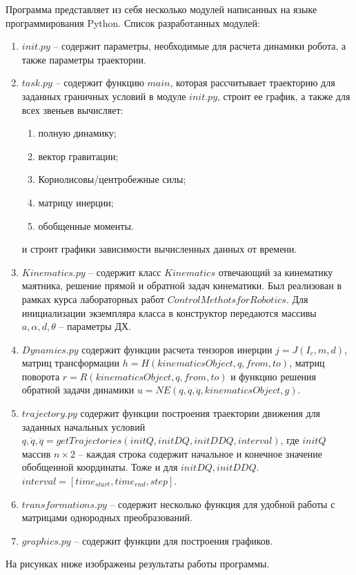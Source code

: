 \documentclass[a4paper,14pt]{extreport}
\begin{document}
Программа представляет из себя несколько модулей написанных на языке программирования Python. Список разработанных модулей:
\begin{enumerate}
\item $init.py$ -- содержит параметры, необходимые для расчета динамики робота, а также параметры траектории.
\item $task.py$ -- содержит функцию $main$, которая рассчитывает траекторию для заданных граничных условий в модуле $init.py$, строит ее график, а также для всех звеньев вычисляет:
\begin{enumerate}
	\item полную динамику;
	\item вектор гравитации;
	\item Кориолисовы/центробежные силы;
	\item матрицу инерции;
	\item обобщенные моменты.
\end{enumerate}
и строит графики зависимости вычисленных данных от времени.
\item $Kinematics.py$ -- содержит класс $Kinematics$ отвечающий за кинематику маятника, решение прямой и обратной задач кинематики. Был реализован в рамках курса лабораторных работ $Control Methots for Robotics$.
Для инициализации экземпляра класса в конструктор передаются массивы $a, \alpha, d, \theta$ -- параметры ДХ.
\item $Dynamics.py$ содержит функции расчета тензоров инерции $j = J(I_c, m, d)$, матриц трансформации $h = H(kinematicsObject, q, from, to)$, матриц поворота $r = R(kinematicsObject, q, from, to)$ и функцию решения обратной задачи динамики $u = NE(q,\dot q, \ddot q, kinematicsObject, g)$.
\item $trajectory.py$ содержит функции построения траектории движения для заданных начальных условий $q, \dot q, \ddot q = getTrajectories(initQ, initDQ, initDDQ, interval)$, где $initQ$ массив $n \times 2$ -- каждая строка содержит начальное и конечное значение обобщенной координаты. Тоже и для $initDQ, initDDQ$. $interval = [time_{start}, time_{end}, step]$.
\item $transformations.py$ -- содержит несколько функция для удобной работы с матрицами однородных преобразований.
\item $graphics.py$ -- содержит функции для построения графиков.
\end{enumerate}

На рисунках ниже изображены результаты работы программы.
\end{document}
